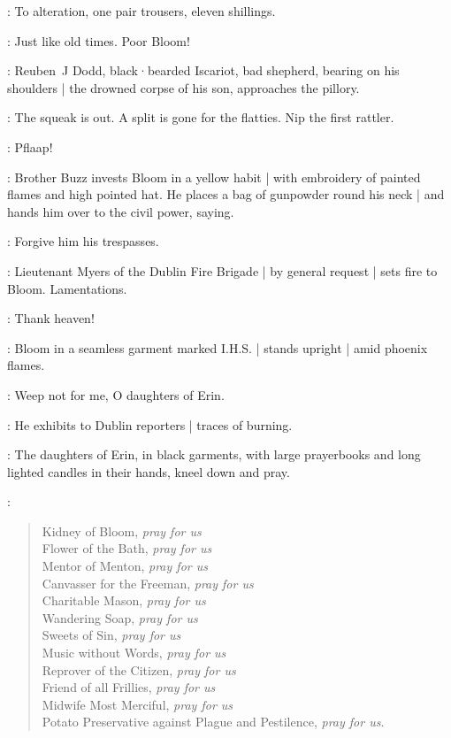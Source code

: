 \Mesias:
To alteration,
one pair trousers,
eleven shillings.

\Bloom:
Just like old times.
Poor Bloom!

:
Reuben~J Dodd,
black·bearded Iscariot,
bad shepherd,
bearing on his shoulders |
the drowned corpse of his son,
approaches the pillory.%

\ReubenJ:
The squeak is out.
A split is gone for the flatties.
Nip the first rattler.

\FireBrigade:
Pflaap!

:
Brother Buzz invests Bloom in a yellow habit |
with embroidery of painted flames and high pointed hat.
He places a bag of gunpowder round his neck |
and hands him over to the civil power,
saying.

\BrotherBuzz:
Forgive him his trespasses.

:
Lieutenant Myers of the Dublin Fire Brigade |
by general request |
sets fire to Bloom.
Lamentations.

\Citizen[1]:
Thank heaven!

:
Bloom in a seamless garment marked I.H.S. |
stands upright |
amid phoenix flames.

\Bloom:
Weep not for me,
O daughters of Erin.

:
He exhibits to Dublin reporters |
traces of burning.

:
The daughters of Erin,
in black garments,
with large prayerbooks and long lighted candles in their hands,
kneel down and pray.

\DaughtersErin:
\begin{verse}
    Kidney of Bloom, \emph{pray for us}\\
    Flower of the Bath, \emph{pray for us}\\
    Mentor of Menton, \emph{pray for us}\\
    Canvasser for the Freeman, \emph{pray for us}\\
    Charitable Mason, \emph{pray for us}\\
    Wandering Soap, \emph{pray for us}\\
    Sweets of Sin, \emph{pray for us}\\
    Music without Words, \emph{pray for us}\\
    Reprover of the Citizen, \emph{pray for us}\\
%
    Friend of all Frillies, \emph{pray for us}\\
    Midwife Most Merciful, \emph{pray for us}\\
    Potato Preservative against Plague and Pestilence, \emph{pray for us}.
\end{verse}

